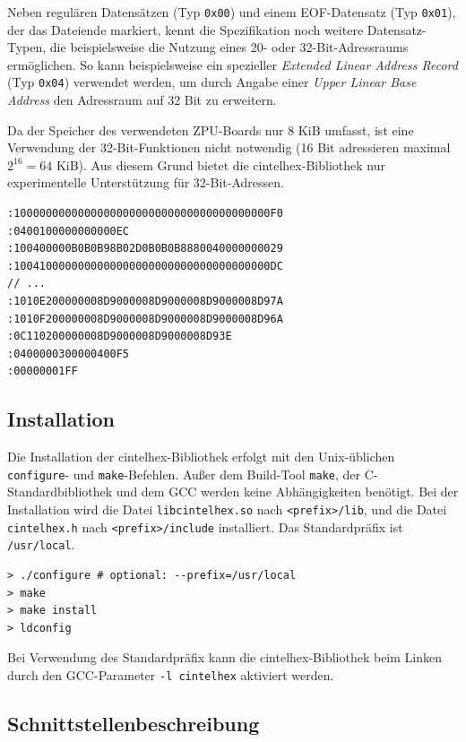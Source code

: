 \documentclass[11pt]{scrartcl}
\begin{document}
Neben regulären Datensätzen (Typ \texttt{0x00}) und einem EOF-Datensatz (Typ \texttt{0x01}), der das Dateiende markiert, kennt die Spezifikation noch weitere Datensatz-Typen, die beispielsweise die Nutzung eines 20- oder 32-Bit-Adressraums ermöglichen. So kann beispielsweise ein spezieller \emph{Extended Linear Address Record} (Typ \texttt{0x04}) verwendet werden, um durch Angabe einer \emph{Upper Linear Base Address} den Adressraum auf 32 Bit zu erweitern.

Da der Speicher des verwendeten ZPU-Boards nur 8 KiB umfasst, ist eine Verwendung der 32-Bit-Funktionen nicht notwendig (16 Bit adressieren maximal $2^{16} = 64$ KiB). Aus diesem Grund bietet die cintelhex-Bibliothek nur experimentelle Unterstützung für 32-Bit-Adressen.

\begin{lstlisting}[caption=Beispiel einer Intel HEX-Eingabedatei,float=bpt,label=ihex_example]
:1000000000000000000000000000000000000000F0
:0400100000000000EC
:100400000B0B0B98B02D0B0B0B8880040000000029
:1004100000000000000000000000000000000000DC
// ...
:1010E200000008D9000008D9000008D9000008D97A
:1010F200000008D9000008D9000008D9000008D96A
:0C110200000008D9000008D9000008D93E
:0400000300000400F5
:00000001FF
\end{lstlisting}

\subsection{Installation}

Die Installation der cintelhex-Bibliothek erfolgt mit den Unix-üblichen \texttt{configure}- und \texttt{make}-Befehlen. Außer dem Build-Tool \texttt{make}, der C-Standardbibliothek und dem GCC werden keine Abhängigkeiten benötigt. Bei der Installation wird die Datei \texttt{libcintelhex.so} nach \texttt{<prefix>/lib}, und die Datei \texttt{cintelhex.h} nach \texttt{<prefix>/include} installiert. Das Standardpräfix ist \texttt{/usr/local}.

\begin{lstlisting}[caption=Installation der cintelhex-Bibliothek]
> ./configure # optional: --prefix=/usr/local
> make
> make install
> ldconfig
\end{lstlisting}

Bei Verwendung des Standardpräfix kann die cintelhex-Bibliothek beim Linken durch den GCC-Parameter \texttt{-l cintelhex} aktiviert werden.

\subsection{Schnittstellenbeschreibung}
\end{document}
